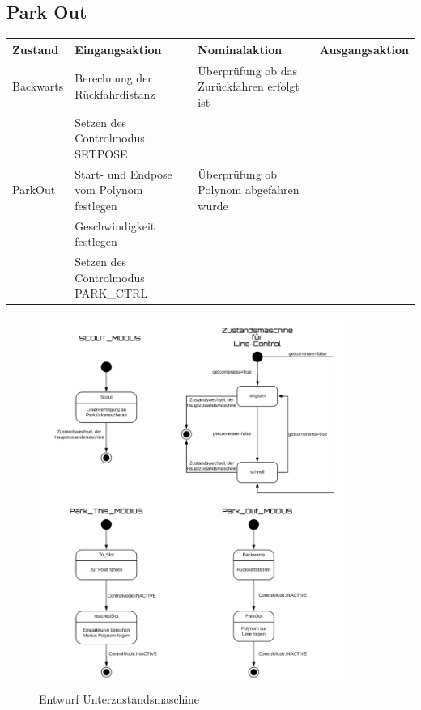 \subsection{Park Out}

\begin{tabular}{|p{1.7cm}|p{4cm}|p{4cm}|p{3cm}|}
	\hline 
	Zustand & Eingangsaktion & Nominalaktion & Ausgangsaktion \\ 
	\hline 
	Backwarts & Berechnung der Rückfahrdistanz & Überprüfung ob das Zurückfahren erfolgt ist &  \\ 
	\hline
	 & Setzen des Controlmodus \glqq SETPOSE\grqq{} & &\\ 
	\hline
	ParkOut & Start- und Endpose vom Polynom festlegen  & Überprüfung ob Polynom abgefahren wurde  &  \\ 
	\hline 
	 & Geschwindigkeit festlegen  &  &  \\ 
	\hline  
	& Setzen des Controlmodus \glqq PARK\_CTRL\grqq{} & &  \\ 
	\hline
 
\end{tabular} 

\begin{figure}[h]
	\centering
	\includegraphics[width=0.9\textwidth]{Subzustandsmaschine}
	\caption{Entwurf Unterzustandsmaschine}
	\label{img:grafik-Unterzustandsautomat}
\end{figure}
